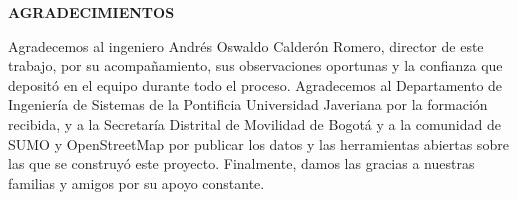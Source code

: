 \begin{center}
    \textbf{AGRADECIMIENTOS}
\end{center}

\vspace{0.25cm}

Agradecemos al ingeniero Andr\'es Oswaldo Calder\'on Romero, director de este trabajo, por su acompa\~namiento, sus observaciones oportunas y la confianza que depositó en el equipo durante todo el proceso. Agradecemos al Departamento de Ingenier\'ia de Sistemas de la Pontificia Universidad Javeriana por la formaci\'on recibida, y a la Secretar\'ia Distrital de Movilidad de Bogot\'a y a la comunidad de SUMO y OpenStreetMap por publicar los datos y las herramientas abiertas sobre las que se construy\'o este proyecto. Finalmente, damos las gracias a nuestras familias y amigos por su apoyo constante.
